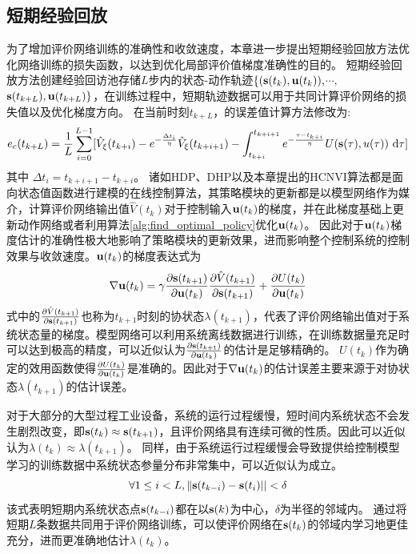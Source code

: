 \subsection{短期经验回放}
为了增加评价网络训练的准确性和收敛速度，本章进一步提出短期经验回放方法优化网络训练的损失函数，以达到优化局部评价值梯度准确性的目的。
短期经验回放方法创建经验回访池存储$L$步内的状态-动作轨迹$\{(\mathbf s(t_k), \mathbf u(t_k))\text{,}$$\cdots \text{,}$$\mathbf s(t_{k+L}), \mathbf u(t_{k+L})\}$，在训练过程中，短期轨迹数据可以用于共同计算评价网络的损失值以及优化梯度方向。
在当前时刻$t_{k+L}$，的误差值计算方法修改为:
\begin{equation}
  e_{c }(t_{k+L})=\frac{1}{L}\sum_{i=0}^{L-1}[\hat{V}_{\xi}(t_{k+i})-e^{-\frac{\Delta t_i}{\eta}} \hat{V}_{\xi}(t_{k+i+1})-\int_{t_{k+i}}^{t_{k+i+1}}e^{-\frac{\tau-t_{k+i}}{\eta}}U(\mathbf s(\tau), u(\tau))\mathrm{~d} \tau]
  \label{equ:TDerror_replay}
  \end{equation}
  其中 $\Delta t_i = t_{k+i+1}-t_{k+i}$。
诸如HDP、DHP以及本章提出的HCNVI算法都是面向状态值函数进行建模的在线控制算法，其策略模块的更新都是以模型网络作为媒介，计算评价网络输出值$\hat{V}(t_k)$对于控制输入${\mathbf
u}(t_k)$的梯度，并在此梯度基础上更新动作网络或者利用算法\ref{alg:find_optimal_policy}优化${\mathbf u}(t_k)$。
因此对于${\mathbf u}(t_k)$梯度估计的准确性极大地影响了策略模块的更新效果，进而影响整个控制系统的控制效果与收敛速度。${\mathbf u}(t_k)$的梯度表达式为
\begin{equation}
\label{equ:uk_grad} \nabla \mathbf u(t_k)=\gamma\frac{\partial \mathbf s(t_{k+1})}{\partial \mathbf u(t_k)}\frac{\partial\hat{V}(t_{k+1})}{\partial \mathbf s(t_{k+1})}+\frac{\partial U(t_k)}{\partial \mathbf u(t_k)}
\end{equation}
式中的$\frac{\partial\hat{V}(t_{k+1})}{\partial \mathbf
s(t_{k+1})}$也称为$t_{k+1}$时刻的协状态$\lambda(t_{k+1})$，代表了评价网络输出值对于系统状态量的梯度。模型网络可以利用系统离线数据进行训练，在训练数据量充足时可以达到极高的精度，可以近似认为$\frac{\partial
\mathbf s(t_{k+1})}{\partial \mathbf u(t_k)}$的估计是足够精确的。
$U(t_k)$作为确定的效用函数使得$\frac{\partial U(t_k)}{\partial \mathbf
u(t_k)}$是准确的。因此对于$\nabla \mathbf
u(t_k)$的估计误差主要来源于对协状态$\lambda(t_{k+1})$的估计误差。

对于大部分的大型过程工业设备，系统的运行过程缓慢，短时间内系统状态不会发生剧烈改变，即$\mathbf s(t_k)\approx \mathbf s(t_{k+1})$，且评价网络具有连续可微的性质。因此可以近似认为$\lambda(t_k)\approx \lambda(t_{k+1})$。
同样，由于系统运行过程缓慢会导致提供给控制模型学习的训练数据中系统状态参量分布非常集中，可以近似认为成立。
\begin{equation}
\label{equ:x_equation} \forall 1 \leq i<L, \| \mathbf s(t_{k-i})-\mathbf s(t_i)||<\delta
\end{equation}
该式表明短期内系统状态点$\mathbf s(t_{k-i})$都在以$\mathbf s(k)$为中心，$\delta$为半径的邻域内。
通过将短期$L$条数据共同用于评价网络训练，可以使评价网络在$\mathbf s(t_k)$的邻域内学习地更佳充分，进而更准确地估计$\lambda(t_k)$。

